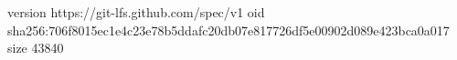 version https://git-lfs.github.com/spec/v1
oid sha256:706f8015ec1e4c23e78b5ddafc20db07e817726df5e00902d089e423bca0a017
size 43840
